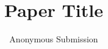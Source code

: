 \documentclass[letterpaper]{article} %
\title{Paper Title}
\author{Anonymous Submission}
\begin{document}
\maketitle

\begin{abstract}
\end{abstract}












% 
\end{document}
